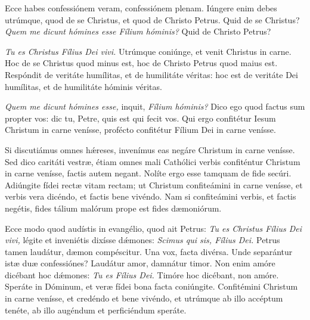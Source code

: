 {{\noindent Ecce habes confessiónem veram, confessiónem plenam. Iúngere enim debes utrúmque, quod de se Christus, et quod de Christo Petrus. Quid de se Christus? \emph{Quem me dicunt hómines esse Fílium hóminis?} Quid de Christo Petrus?

\noindent \emph{Tu es Christus Fílius Dei vivi.} Utrúmque coniúnge, et venit Christus in carne. Hoc de se Christus quod minus est, hoc de Christo Petrus quod maius est. Respóndit de veritáte humílitas, et de humilitáte véritas: hoc est de veritáte Dei humílitas, et de humilitáte hóminis véritas.}

\noindent \emph{Quem me dicunt hómines esse,} inquit, \emph{Fílium hóminis?} Dico ego quod factus sum propter vos: dic tu, Petre, quis est qui fecit vos. Qui ergo confitétur Iesum Christum in carne venísse, profécto confitétur Fílium Dei in carne venísse.

\noindent Si discutiámus omnes hǽreses, invenímus eas negáre Christum in carne venísse. Sed dico caritáti vestræ, étiam omnes mali Cathólici verbis confiténtur Christum in carne venísse, factis autem negant. Nolíte ergo esse tamquam de fide secúri. Adiúngite fídei rectæ vitam rectam; ut Christum confiteámini in carne venísse, et verbis vera dicéndo, et factis bene vivéndo. Nam si confiteámini verbis, et factis negétis, fides tálium malórum prope est fides dæmoniórum.

\noindent Ecce modo quod audístis in evangélio, quod ait Petrus: \emph{Tu es Christus Fílius Dei vivi,} légite et inveniétis dixísse dǽmones: \emph{Scimus qui sis, Fílius Dei.} Petrus tamen laudátur, dæmon compéscitur. Una vox, facta divérsa. Unde separántur istæ duæ confessiónes? Laudátur amor, damnátur timor. Non enim amóre dicébant hoc dǽmones: \emph{Tu es Fílius Dei.} Timóre hoc dicébant, non amóre. Speráte in Dóminum, et veræ fídei bona facta coniúngite. Confitémini Christum in carne venísse, et credéndo et bene vivéndo, et utrúmque ab illo accéptum tenéte, ab illo augéndum et perficiéndum speráte.


\vfill
\pagebreak

 

\vspace{-5mm}


\vfill
\pagebreak
}
\newcommand{\responsoriumbreve}{\pars{Responsorium breve.}

\cuminitiali{VI}{temporalia/resp-christefilidei.gtex}}
